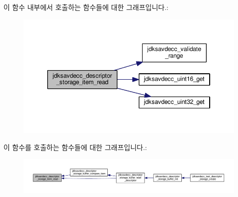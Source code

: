 이 함수 내부에서 호출하는 함수들에 대한 그래프입니다.\+:
\nopagebreak
\begin{figure}[H]
\begin{center}
\leavevmode
\includegraphics[width=346pt]{group__descriptor__storage__item_gab105c3730864b355b06526c4ad53af7a_cgraph}
\end{center}
\end{figure}




이 함수를 호출하는 함수들에 대한 그래프입니다.\+:
\nopagebreak
\begin{figure}[H]
\begin{center}
\leavevmode
\includegraphics[width=350pt]{group__descriptor__storage__item_gab105c3730864b355b06526c4ad53af7a_icgraph}
\end{center}
\end{figure}


